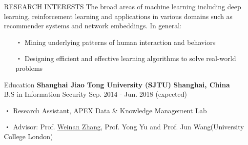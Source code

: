 \documentclass{resume} %
\begin{document}
\vspace{-1em}
\begin{rSection}{RESEARCH INTERESTS}
The broad areas of machine learning including deep learning, reinforcement learning and applications in various domains such as recommender systems and network embeddings. In general:
\begin{itemize}[itemindent=-5mm] 
	\itemsep=-5pt
	\vspace*{-5pt}
	\item[・] Mining underlying patterns of human interaction and behaviors
	\item[・] Designing efficient and effective learning algorithms to solve real-world problems
\end{itemize}
\end{rSection}


\begin{rSection}{Education}
\textbf{Shanghai Jiao Tong University (SJTU)} \hfill \textbf{Shanghai, China}\\ %
B.S in Information Security \hfill Sep. 2014 - Jun. 2018 (expected)
\vspace{-5pt}
\item[・] Research Assistant, APEX Data \& Knowledge Management Lab
\vspace{-5pt}
\item[・] Advisor: Prof. \href{http://wnzhang.net}{Weinan Zhang}, Prof. Yong Yu and Prof. Jun Wang(University College London)
\end{rSection}
\end{document}
